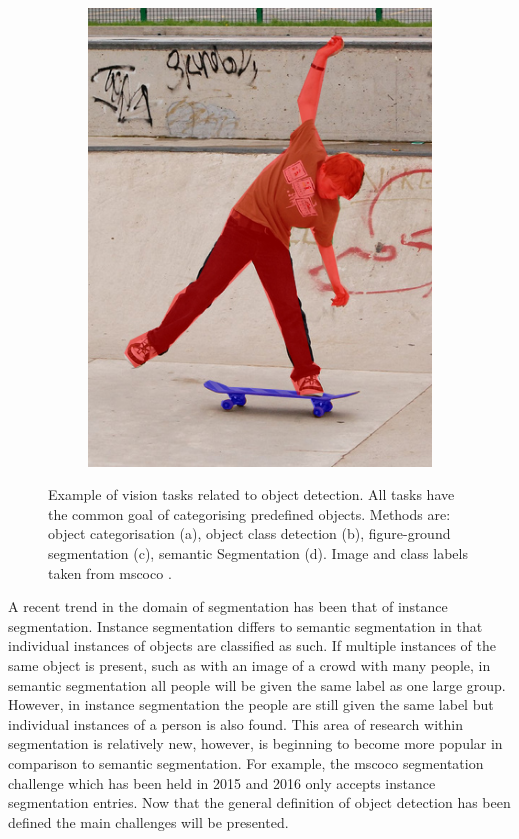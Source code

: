 \begin{figure}[H]
\begin{subfigure}[b]{0.2\textwidth}
        \includegraphics[width=\textwidth]{Figs/Problem/objfieldssegmentation.png}
        \caption{}\label{fig:objseg}
    \end{subfigure}
    \caption{Example of vision tasks related to object detection. All tasks have the common goal of categorising predefined objects. Methods are: object categorisation (a), object class detection (b), figure-ground segmentation (c), semantic Segmentation (d). Image and class labels taken from \gls{mscoco} \cite{mscoco}.}
    \label{fig:objfields}
\end{figure} 

A recent trend in the domain of segmentation has been that of instance segmentation. Instance segmentation differs to semantic segmentation in that individual instances of objects are classified as such. If multiple instances of the same object is present, such as with an image of a crowd with many people, in semantic segmentation all people will be given the same label as one large group. However, in instance segmentation the people are still given the same label but individual instances of a person is also found. This area of research within segmentation is relatively new, however, is beginning to become more popular in comparison to semantic segmentation. For example, the \gls{mscoco} segmentation challenge which has been held in 2015 and 2016 only accepts instance segmentation entries. Now that the general definition of object detection has been defined the main challenges will be presented.


